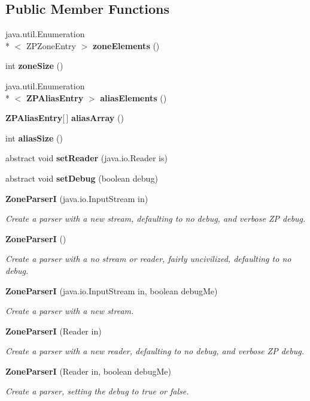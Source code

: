 \subsection*{Public Member Functions}
\begin{DoxyCompactItemize}
\item 
java.\-util.\-Enumeration\\*
$<$ Z\-P\-Zone\-Entry $>$ {\bf zone\-Elements} ()
\item 
int {\bf zone\-Size} ()
\item 
java.\-util.\-Enumeration\\*
$<$ {\bf Z\-P\-Alias\-Entry} $>$ {\bf alias\-Elements} ()
\item 
{\bf Z\-P\-Alias\-Entry}[$\,$] {\bf alias\-Array} ()
\item 
int {\bf alias\-Size} ()
\item 
abstract void {\bf set\-Reader} (java.\-io.\-Reader is)
\item 
abstract void {\bf set\-Debug} (boolean debug)
\item 
{\bf Zone\-Parser\-I} (java.\-io.\-Input\-Stream in)
\begin{DoxyCompactList}\small\item\em Create a parser with a new stream, defaulting to no debug, and verbose Z\-P debug. \end{DoxyCompactList}\item 
{\bf Zone\-Parser\-I} ()
\begin{DoxyCompactList}\small\item\em Create a parser with a no stream or reader, fairly uncivilized, defaulting to no debug. \end{DoxyCompactList}\item 
{\bf Zone\-Parser\-I} (java.\-io.\-Input\-Stream in, boolean debug\-Me)
\begin{DoxyCompactList}\small\item\em Create a parser with a new stream. \end{DoxyCompactList}\item 
{\bf Zone\-Parser\-I} (Reader in)
\begin{DoxyCompactList}\small\item\em Create a parser with a new reader, defaulting to no debug, and verbose Z\-P debug. \end{DoxyCompactList}\item 
{\bf Zone\-Parser\-I} (Reader in, boolean debug\-Me)
\begin{DoxyCompactList}\small\item\em Create a parser, setting the debug to true or false. \end{DoxyCompactList}\item 

\end{DoxyCompactItemize}
